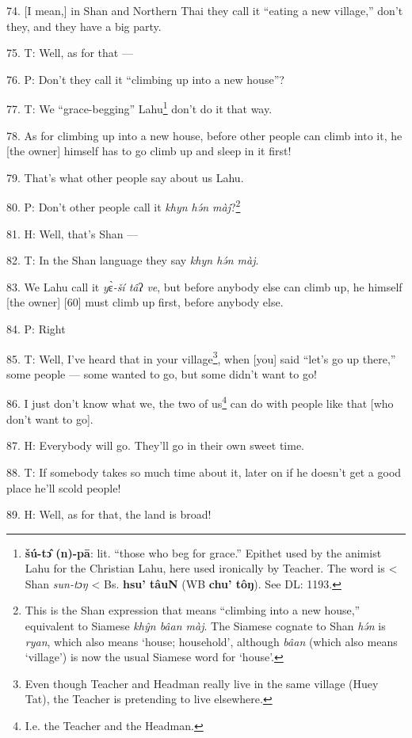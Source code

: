 74. [I mean,] in Shan and Northern Thai they call it ``eating a new village,''
don't they, and they have a big party.

75. T: Well, as for that ---

76. P: Don't they call it ``climbing up into a new house''?

77. T: We ``grace-begging'' Lahu\footnote{\textbf{šú-tɔ̂ (n)-pā}: lit. ``those who beg for grace.'' Epithet used by the animist Lahu for the Christian Lahu, here used ironically by Teacher. The word is < Shan \textit{sun-tɔŋ} < Bs. \textbf{hsu' tâuN} (WB \textbf{chu' tôŋ}). See DL: 1193.} don't do it that way.

78. As for climbing up into a new house, before other people can climb into it,
he [the owner] himself has to go climb up and sleep in it first!

79. That's what other people say about us Lahu.

80. P: Don't other people call it \textit{khyn hə́n màj}?\footnote{This is the Shan expression that means ``climbing into a new house,'' equivalent to Siamese \textit{khŷn bâan màj}. The Siamese cognate to Shan \textit{hə́n} is \textit{ryan}, which also means `house; household', although \textit{bâan} (which also means `village') is now the usual Siamese word for `house'.}

81. H: Well, that's Shan ---

82. T: In the Shan language they say \textit{khyn hə́n màj}.

83. We Lahu call it \textit{y}ɛ̀\textit{-ší tâ}ʔ\textit{ ve}, but before
anybody else can climb up, he himself [the owner] [60] must climb up first, before
anybody else.

84. P: Right

85. T: Well, I've heard that in your village\footnote{Even though Teacher and Headman really live in the same village (Huey Tat), the Teacher is pretending to live elsewhere.}, when [you] said ``let's go up
there,'' some people --- some wanted to go, but some didn't want to go!

86. I just don't know what we, the two of us\footnote{I.e. the Teacher and the Headman.} can do with people like that
[who don't want to go].

87. H: Everybody will go. They'll go in their own sweet time.

88. T: If somebody takes so much time about it, later on if he doesn't get a good
place he'll scold people!

89. H: Well, as for that, the land is broad!

